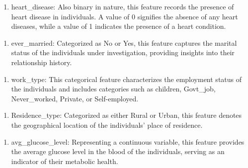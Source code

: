 \documentclass[letterpaper]{article}
\newcounter{saveenum}
\newcommand\liststyleWWNumi{%
\renewcommand\theenumi{\arabic{enumi}}
\renewcommand\theenumii{\arabic{enumii}}
\renewcommand\theenumiii{\arabic{enumiii}}
\renewcommand\theenumiv{\arabic{enumiv}}
\renewcommand\labelenumi{\theenumi.}
\renewcommand\labelenumii{\theenumii.}
\renewcommand\labelenumiii{\theenumiii.}
\renewcommand\labelenumiv{\theenumiv.}
}
\begin{document}
\bigskip

\liststyleWWNumi
\setcounter{saveenum}{\value{enumi}}
\begin{enumerate}
\setcounter{enumi}{\value{saveenum}}
\item {
heart\_disease: Also binary in nature, this feature records the presence of heart disease in individuals. A value of 0
signifies the absence of any heart diseases, while a value of 1 indicates the presence of a heart condition.}
\end{enumerate}

\bigskip

\liststyleWWNumi
\setcounter{saveenum}{\value{enumi}}
\begin{enumerate}
\setcounter{enumi}{\value{saveenum}}
\item {
ever\_married: Categorized as {\textquotedbl}No{\textquotedbl} or {\textquotedbl}Yes,{\textquotedbl} this feature
captures the marital status of the individuals under investigation, providing insights into their relationship
history.}
\end{enumerate}

\bigskip

\liststyleWWNumi
\setcounter{saveenum}{\value{enumi}}
\begin{enumerate}
\setcounter{enumi}{\value{saveenum}}
\item {
work\_type: This categorical feature characterizes the employment status of the individuals and includes categories such
as {\textquotedbl}children,{\textquotedbl} {\textquotedbl}Govt\_job,{\textquotedbl}
{\textquotedbl}Never\_worked,{\textquotedbl} {\textquotedbl}Private,{\textquotedbl} or
{\textquotedbl}Self-employed.{\textquotedbl}}
\end{enumerate}

\bigskip

\liststyleWWNumi
\setcounter{saveenum}{\value{enumi}}
\begin{enumerate}
\setcounter{enumi}{\value{saveenum}}
\item {
Residence\_type: Categorized as either {\textquotedbl}Rural{\textquotedbl} or {\textquotedbl}Urban,{\textquotedbl} this
feature denotes the geographical location of the individuals' place of residence.}
\end{enumerate}

\bigskip

\liststyleWWNumi
\setcounter{saveenum}{\value{enumi}}
\begin{enumerate}
\setcounter{enumi}{\value{saveenum}}
\item {
avg\_glucose\_level: Representing a continuous variable, this feature provides the average glucose level in the blood of
the individuals, serving as an indicator of their metabolic health.}
\end{enumerate}
\end{document}
